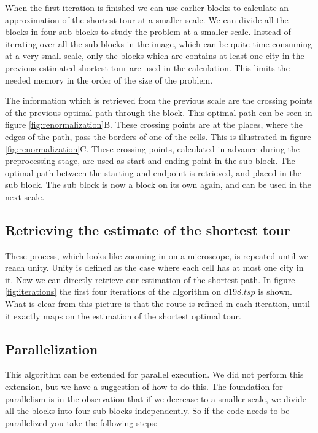 When the first iteration is finished we can use earlier blocks to calculate an
approximation of the shortest tour at a smaller scale. We can divide all the
blocks in four sub blocks to study the problem at a smaller scale. Instead of
iterating over all the sub blocks in the image, which can be quite time
consuming at a very small scale, only the blocks which are contains at least
one city in the previous estimated shortest tour are used in the calculation.
This limits the needed memory in the order of the size of the problem.

The information which is retrieved from the previous scale are the crossing
points of the previous optimal path through the block. This optimal path can
be seen in figure \ref{fig:renormalization}B.  These crossing points are at
the places, where the edges of the path, pass the borders of one of the cells.
This is illustrated in figure \ref{fig:renormalization}C. These crossing
points, calculated in advance during the preprocessing stage, are used as start and
ending point in the sub block. The optimal path between the starting and
endpoint is retrieved, and placed in the sub block. The sub block is now a block
on its own again, and can be used in the next scale.

\subsection{Retrieving the estimate of the shortest tour}
These process, which looks like zooming in on a microscope, is repeated until
we reach unity. Unity is defined as the case where each cell has at most one
city in it. Now we can directly retrieve our estimation of the shortest path.
In figure \ref{fig:iterations} the first four iterations of the algorithm on
$d198.tsp$ is shown. What is clear from this picture is that the route is
refined in each iteration, until it exactly maps on the estimation  of the
shortest optimal tour.

\subsection{Parallelization}
This algorithm can be extended for parallel execution. We did not perform this
extension, but we have a suggestion of how to do this. The foundation for
parallelism is in the observation that if we decrease to a smaller scale, we
divide all the blocks into four sub blocks independently. So if the code needs
to be parallelized you take the following steps:

